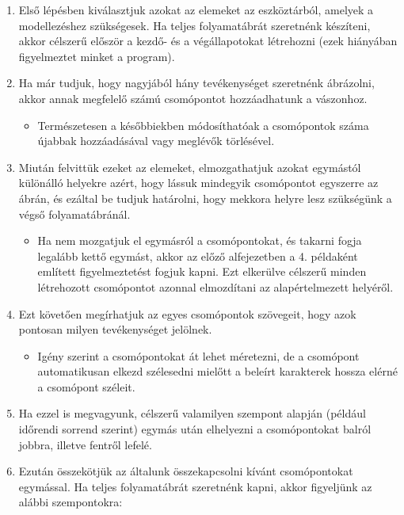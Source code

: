 \begin{enumerate}
\item Első lépésben kiválasztjuk azokat az elemeket az eszköztárból, amelyek a modellezéshez szükségesek. Ha teljes folyamatábrát szeretnénk készíteni, akkor célszerű először a kezdő- és a végállapotokat létrehozni (ezek hiányában figyelmeztet minket a program).
\item Ha már tudjuk, hogy nagyjából hány tevékenységet szeretnénk ábrázolni, akkor annak megfelelő számú csomópontot hozzáadhatunk a vászonhoz.

\begin{itemize}
\item Természetesen a későbbiekben módosíthatóak a csomópontok száma újabbak hozzáadásával vagy meglévők törlésével.
\end{itemize}

\item Miután felvittük ezeket az elemeket, elmozgathatjuk azokat egymástól különálló helyekre azért, hogy lássuk mindegyik csomópontot egyszerre az ábrán, és ezáltal be tudjuk határolni, hogy mekkora helyre lesz szükségünk a végső folyamatábránál.

\begin{itemize}
\item Ha nem mozgatjuk el egymásról a csomópontokat, és takarni fogja legalább kettő egymást, akkor az előző alfejezetben a 4. példaként említett figyelmeztetést fogjuk kapni. Ezt elkerülve célszerű minden létrehozott csomópontot azonnal elmozdítani az alapértelmezett helyéről.
\end{itemize}

\item Ezt követően megírhatjuk az egyes csomópontok szövegeit, hogy azok pontosan milyen tevékenységet jelölnek.

\begin{itemize}
\item Igény szerint a csomópontokat át lehet méretezni, de a csomópont automatikusan elkezd szélesedni mielőtt a beleírt karakterek hossza elérné a csomópont széleit.
\end{itemize}

\item Ha ezzel is megvagyunk, célszerű valamilyen szempont alapján (például időrendi sorrend szerint) egymás után elhelyezni a csomópontokat balról jobbra, illetve fentről lefelé.
\item Ezután összekötjük az általunk összekapcsolni kívánt csomópontokat egymással. Ha teljes folyamatábrát szeretnénk kapni, akkor figyeljünk az alábbi szempontokra:


\end{enumerate}
